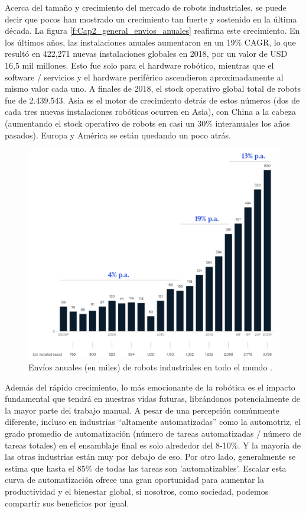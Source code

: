         \newpage


    Acerca del tamaño y crecimiento del mercado de robots industriales, se puede decir que pocos han mostrado un crecimiento tan fuerte y sostenido en la última década. La figura \eqref{f:Cap2_general_envios_anuales} reafirma este crecimiento. En los últimos años, las instalaciones anuales aumentaron en un 19\% CAGR, lo que resultó en 422,271 nuevas instalaciones globales en 2018, por un valor de USD 16,5 mil millones. Esto fue solo para el hardware robótico, mientras que el software / servicios y el hardware periférico ascendieron aproximadamente al mismo valor cada uno. A finales de 2018, el stock operativo global total de robots fue de 2.439.543. Asia es el motor de crecimiento detrás de estos números (dos de cada tres nuevas instalaciones robóticas ocurren en Asia), con China a la cabeza (aumentando el stock operativo de robots en casi un 30\% interanuales los años pasados). Europa y América se están quedando un poco atrás. 
    \begin{figure}[H]
        \centering
        \includegraphics[width=0.67\linewidth]{Main/Chapter2/Images2/envios-anuales-robots.png}
        \caption{Envíos anuales (en miles) de robots industriales en todo el mundo \cite{growth_Insights}.}
        \label{f:Cap2_general_envios_anuales}
    \end{figure}
    Además del rápido crecimiento, lo más emocionante de la robótica es el impacto fundamental que tendrá en nuestras vidas futuras, librándonos potencialmente de la mayor parte del trabajo manual. A pesar de una percepción comúnmente diferente, incluso en industrias “altamente automatizadas” como la automotriz, el grado promedio de automatización (número de tareas automatizadas / número de tareas totales) en el ensamblaje final es solo alrededor del 8-10\%. Y la mayoría de las otras industrias están muy por debajo de eso. Por otro lado, generalmente se estima que hasta el 85\% de todas las tareas son 'automatizables'. Escalar esta curva de automatización ofrece una gran oportunidad para aumentar la productividad y el bienestar global, si nosotros, como sociedad, podemos compartir sus beneficios por igual.
    
